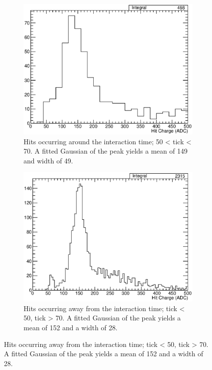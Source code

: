 \begin{figure}
  \centering
  \begin{subfigure}[t]{0.48\linewidth}
    \centering
    \includegraphics[width=\textwidth]{HitChargeInteraction.eps}
    \caption{Hits occurring around the interaction time; 50 < tick < 70.  A fitted Gaussian of the peak yields a mean of 149 and width of 49.}
    \label{fig:HitChargeInteraction}
  \end{subfigure}
  \hfill
  \begin{subfigure}[t]{0.48\linewidth}
    \centering
    \includegraphics[width=\textwidth]{HitChargeNonInteraction.eps}
    \caption{Hits occurring away from the interaction time; tick < 50, tick > 70.  A fitted Gaussian of the peak yields a mean of 152 and a width of 28.}

\end{subfigure}
\end{figure}
